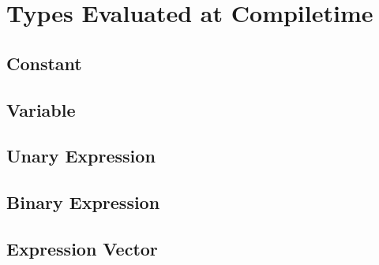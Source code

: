 \section{Types Evaluated at Compiletime} \label{sec:compiletime-types}

 \subsection{Constant}

 \subsection{Variable}

 \subsection{Unary Expression}

 \subsection{Binary Expression}

 \subsection{Expression Vector}



